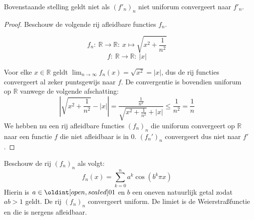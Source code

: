\documentclass[main.tex]{subfiles}
\begin{document}
\begin{tvb}
  Bovenstaande stelling geldt niet als $(f'_{n})_{n}$ niet uniforum convergeert naar $f'_{n}$.
  \begin{proof}
    Beschouw de volgende rij afleidbare functies $f_{n}$.

    \noindent
    \begin{minipage}{.45\textwidth}
    \begin{figure}[H]
      \centering
    \end{figure}
    \end{minipage}
    \begin{minipage}{.45\textwidth}
    \[ f_{n}:\ \mathbb{R} \rightarrow \mathbb{R}:\ x \mapsto \sqrt{x^{2}+ \frac{1}{n^{2}}} \]
    \[ f:\ \mathbb{R} \rightarrow \mathbb{R}:\ |x| \]
    \end{minipage}

    Voor elke $x\in \mathbb{R}$ geldt $\lim_{n\rightarrow \infty}f_{n}(x) = \sqrt{x^{2}} = |x|$, dus de rij functies convergeert al zeker puntsgewijs naar $f$.
    De convergentie is bovendien uniforum op $\mathbb{R}$ vanwege de volgende afschatting:
    \[
    \left| \sqrt{x^{2}+\frac{1}{n^{2}}} - |x| \right|
    = \frac{\frac{1}{n^{2}}}{\sqrt{x^{2}+\frac{1}{n^{2}}} + |x|}
    \le \frac{1}{n^{2}}
    = \frac{1}{n}
    \]
    We hebben nu een rij afleidbare functies $(f_{n})_{n}$ die uniforum convergeert op $\mathbb{R}$ naar een functie $f$ die niet afleidbaar is in $0$.
    $(f_{n}')_{n}$ convergeert dus niet naar $f'$.
  \end{proof}
\end{tvb}

\begin{tvb}
  Beschouw de rij $(f_{n})_{n}$ als volgt:
  \[ f_{n}(x) = \sum_{k=0}^{n}a^{k}\cos(b^{k}\pi x) \]
  Hierin is $a\in \interval[open]{0}{1}$ en $b$ een oneven natuurlijk getal zodat $ab >1$ geldt.
  De rij $(f_{n})_{n}$ convergeert uniform.
  De limiet is de Weierstra\ss functie en die is nergens afleidbaar.
\end{tvb}
\end{document}
